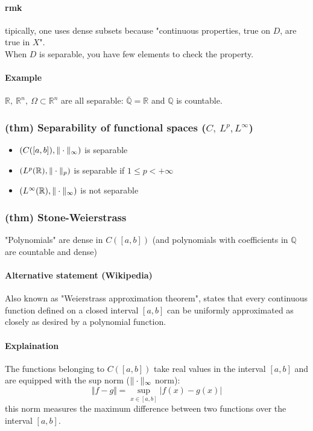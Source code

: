 \paragraph{rmk} tipically, one uses dense subsets because "continuous properties, true on $D$, are true in $X$".\\
When $D$ is separable, you have few elements to check the property.
\paragraph{Example}
$\mathbb R,\ \mathbb R^n,\ \Omega \subset \mathbb R^n$ are all separable: $\overline{\mathbb Q}=\mathbb R$ and $\mathbb Q$ is countable.
\subsubsection{(thm) Separability of functional spaces ($C,\ L^p, L^\infty$)} %
\begin{itemize}
    \item $(C([a,b]), \Vert \cdot \Vert_\infty)$ is separable
    \item $(L^p(\mathbb R), \Vert \cdot \Vert_p)$ is separable if $1\leq p<+\infty$
    \item $(L^\infty(\mathbb R),\Vert \cdot \Vert_\infty)$ is not separable
\end{itemize}
\subsubsection{(thm) Stone-Weierstrass}
"Polynomials" are dense in $C([a,b])$
(and polynomials with coefficients in $\mathbb Q$ are countable and dense)
\paragraph{Alternative statement (Wikipedia)}
Also known as "Weierstrass approximation theorem", states that every continuous function defined on a closed interval $[a,b]$ can be uniformly approximated as closely as desired by a polynomial function.
\paragraph{Explaination}
The functions belonging to $C([a,b])$ take real values in the interval $[a,b]$ and are equipped with the sup norm ($\Vert \cdot \Vert_\infty$ norm): $$\Vert f-g\Vert =\sup_{x\in [a,b]}|f(x)-g(x)|$$
this norm measures the maximum difference between two functions over the interval $[a,b]$. 

